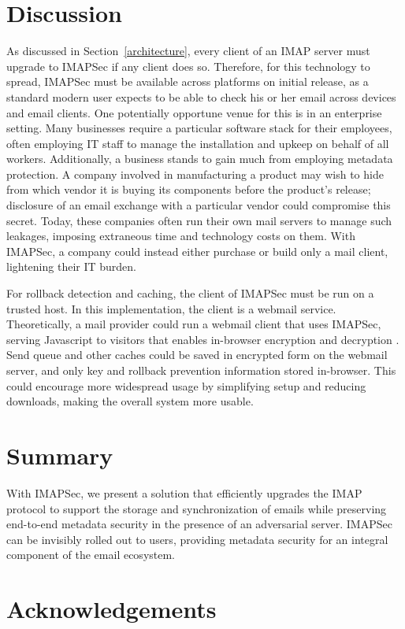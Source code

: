\documentclass[pageno]{jpaper}
\newcommand{\project}{IMAPSec }
\newcommand{\projectnospace}{IMAPSec}
\begin{document}
\section{Discussion}
As discussed in Section~\ref{architecture}, every client of an IMAP server must upgrade to \project if any client does so. Therefore, for this technology to spread, \project must be available across platforms on initial release, as a standard modern user expects to be able to check his or her email across devices and email clients. One potentially opportune venue for this is in an enterprise setting. Many businesses require a particular software stack for their employees, often employing IT staff to manage the installation and upkeep on behalf of all workers. Additionally, a business stands to gain much from employing metadata protection. A company involved in manufacturing a product may wish to hide from which vendor it is buying its components before the product's release; disclosure of an email exchange with a particular vendor could compromise this secret. Today, these companies often run their own mail servers to manage such leakages, imposing extraneous time and technology costs on them. With \projectnospace, a company could instead either purchase or build only a mail client, lightening their IT burden.

For rollback detection and caching, the client of \project must be run on a trusted host. In this implementation, the client is a webmail service. Theoretically, a mail provider could run a webmail client that uses \projectnospace, serving Javascript to visitors that enables in-browser encryption and decryption \cite{wagner}. Send queue and other caches could be saved in encrypted form on the webmail server, and only key and rollback prevention information stored in-browser. This could encourage more widespread usage by simplifying setup and reducing downloads, making the overall system more usable.

\section{Summary}
With \projectnospace, we present a solution that efficiently upgrades the IMAP protocol to support the storage and synchronization of emails while preserving end-to-end metadata security in the presence of an adversarial server. \project can be invisibly rolled out to users, providing metadata security for an integral component of the email ecosystem.

\pagebreak

\section*{Acknowledgements}

\pagebreak



\end{document}
